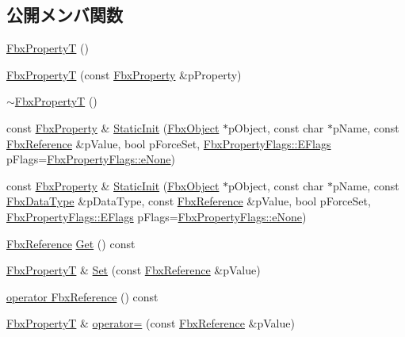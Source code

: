 \subsection*{公開メンバ関数}
\begin{DoxyCompactItemize}
\item 
\hyperlink{class_fbx_property_t_3_01_fbx_reference_01_4_a0e52b59786dc43fcc7e6dc078fb4d609}{Fbx\+PropertyT} ()
\item 
\hyperlink{class_fbx_property_t_3_01_fbx_reference_01_4_a5fadc2ddbd221db69d2907c4745ec6b8}{Fbx\+PropertyT} (const \hyperlink{class_fbx_property}{Fbx\+Property} \&p\+Property)
\item 
\hyperlink{class_fbx_property_t_3_01_fbx_reference_01_4_ab4d98649c0348f55f31f43302a41a7b0}{$\sim$\+Fbx\+PropertyT} ()
\item 
const \hyperlink{class_fbx_property}{Fbx\+Property} \& \hyperlink{class_fbx_property_t_3_01_fbx_reference_01_4_ae40af651436b9b3df5bbb049e512421d}{Static\+Init} (\hyperlink{class_fbx_object}{Fbx\+Object} $\ast$p\+Object, const char $\ast$p\+Name, const \hyperlink{fbxtypes_8h_a44df6a2eec915cf27cd481e5c5e48a24}{Fbx\+Reference} \&p\+Value, bool p\+Force\+Set, \hyperlink{class_fbx_property_flags_afabfa7e0949aac8a7dcdf8a141867e99}{Fbx\+Property\+Flags\+::\+E\+Flags} p\+Flags=\hyperlink{class_fbx_property_flags_afabfa7e0949aac8a7dcdf8a141867e99ac1b9aab93d40af76eb419be426de17b1}{Fbx\+Property\+Flags\+::e\+None})
\item 
const \hyperlink{class_fbx_property}{Fbx\+Property} \& \hyperlink{class_fbx_property_t_3_01_fbx_reference_01_4_ae6f72c54ae167513f7975c56bfeb0281}{Static\+Init} (\hyperlink{class_fbx_object}{Fbx\+Object} $\ast$p\+Object, const char $\ast$p\+Name, const \hyperlink{class_fbx_data_type}{Fbx\+Data\+Type} \&p\+Data\+Type, const \hyperlink{fbxtypes_8h_a44df6a2eec915cf27cd481e5c5e48a24}{Fbx\+Reference} \&p\+Value, bool p\+Force\+Set, \hyperlink{class_fbx_property_flags_afabfa7e0949aac8a7dcdf8a141867e99}{Fbx\+Property\+Flags\+::\+E\+Flags} p\+Flags=\hyperlink{class_fbx_property_flags_afabfa7e0949aac8a7dcdf8a141867e99ac1b9aab93d40af76eb419be426de17b1}{Fbx\+Property\+Flags\+::e\+None})
\item 
\hyperlink{fbxtypes_8h_a44df6a2eec915cf27cd481e5c5e48a24}{Fbx\+Reference} \hyperlink{class_fbx_property_t_3_01_fbx_reference_01_4_a91552cfa2847dc9bd6ec37dff19f1e67}{Get} () const
\item 
\hyperlink{class_fbx_property_t}{Fbx\+PropertyT} \& \hyperlink{class_fbx_property_t_3_01_fbx_reference_01_4_a7d67d93829ab10066d0f7814a676f3c3}{Set} (const \hyperlink{fbxtypes_8h_a44df6a2eec915cf27cd481e5c5e48a24}{Fbx\+Reference} \&p\+Value)
\item 
\hyperlink{class_fbx_property_t_3_01_fbx_reference_01_4_a5c5065932e01bfc6bffb87e6aad34ddf}{operator Fbx\+Reference} () const
\item 
\hyperlink{class_fbx_property_t}{Fbx\+PropertyT} \& \hyperlink{class_fbx_property_t_3_01_fbx_reference_01_4_a84a5262ef5dc13b09eb598d554949ce7}{operator=} (const \hyperlink{fbxtypes_8h_a44df6a2eec915cf27cd481e5c5e48a24}{Fbx\+Reference} \&p\+Value)
\end{DoxyCompactItemize}
